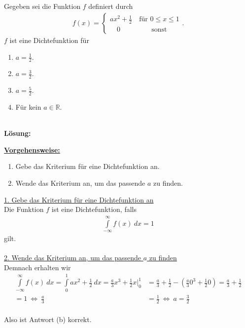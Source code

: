 \subsection*{}
Gegeben sei die Funktion $ f $ definiert durch
\begin{align*}
f(x) = 
\begin{cases}
a x^2 + \frac{1}{2} &\ \textrm{für } 0 \leq x \leq 1\\
\quad 0 &\qquad \textrm{sonst}
\end{cases}.
\end{align*}
$ f $ ist eine Dichtefunktion für
\renewcommand{\labelenumi}{(\alph{enumi})}
\begin{enumerate}
	\item 
	$ a = \frac{1}{2} $.
	\item
	$ a = \frac{3}{2} $.
	\item
	$ a = \frac{5}{2} $.
	\item
	Für kein $ a \in \mathbb{R} $.
\end{enumerate}
\ \\
\textbf{Lösung:}
\begin{mdframed}
\underline{\textbf{Vorgehensweise:}}
\renewcommand{\labelenumi}{\theenumi.}
\begin{enumerate}
\item Gebe das Kriterium für eine Dichtefunktion an.
\item Wende das Kriterium an, um das passende $ a $ zu finden.
\end{enumerate}
\end{mdframed}

\underline{1. Gebe das Kriterium für eine Dichtefunktion an}\\
Die Funktion $ f $ ist eine Dichtefunktion, falls
\begin{align*}
\int \limits_{- \infty}^\infty f(x) \ dx = 1
\end{align*}
gilt.\\
\\
\underline{2. Wende das Kriterium an, um das passende $ a $ zu finden}\\
Demnach erhalten wir
\begin{align*}
\int \limits_{- \infty}^\infty f(x) \ dx
=
\int \limits_{0}^1 ax^2 + \frac{1}{2} \ dx 
=
\frac{a}{3}x^3 + \frac{1}{2}x \bigg|_0^1
&=
\frac{a}{3} + \frac{1}{2} - \left( \frac{a}{3}0^3 + \frac{1}{2}0 \right) =
\frac{a}{3} + \frac{1}{2}\\
 = 1
\ \Leftrightarrow \
\frac{a}{3} &= \frac{1}{2}
\ \Leftrightarrow \
a = \frac{3}{2}
\end{align*}
\ \\
Also ist Antwort (b) korrekt.

